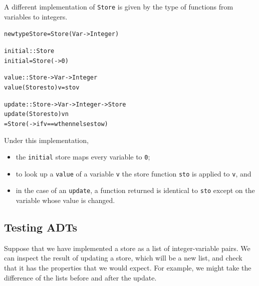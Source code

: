 A different implementation of \texttt{Store} is given by the type of functions
from variables to integers. 
\begin{alltt}
newtype Store = Store (Var -> Integer) 					

initial :: Store 
initial = Store ( -> 0)

value :: Store -> Var -> Integer
value (Store sto) v = sto v

update  :: Store -> Var -> Integer -> Store
update (Store sto) v n 
  = Store ( -> if v==w then n else sto w)
\end{alltt}
Under this implementation, 
\begin{itemize}
\item
the \texttt{initial} store maps every variable to
\texttt{0};
\item
to look up a \texttt{value} of a variable \texttt{v}
the store function \texttt{sto} is applied to \texttt{v}, and 
\item
in the case
of an \texttt{update}, a function returned is identical to \texttt{sto}
except on the variable whose value is changed.
\end{itemize}


\subsection*{Testing ADTs}

Suppose that we have implemented a store as a list of integer-variable pairs. We can inspect the result of updating a store, which will be a new list, and check that it has the properties that we would expect. For example, we might take the difference of the lists before and after the update.

